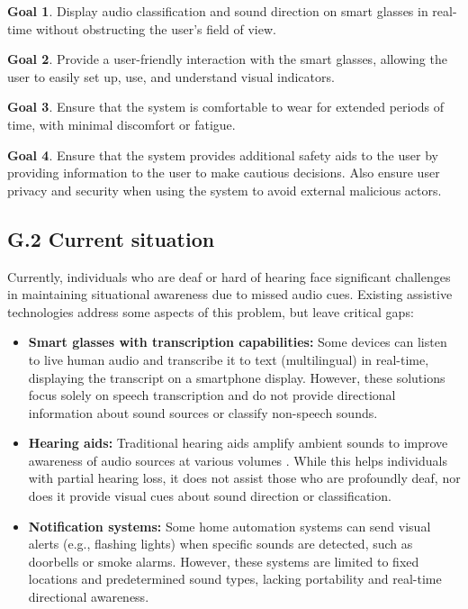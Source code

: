 \documentclass[12pt]{article}
\theoremstyle{definition}
\newtheorem{goal}{Goal}
\begin{document}
\begin{goal}\label{goal:visual_display} Display audio classification and sound
direction on smart glasses in real-time without obstructing the user's field of
view.
\end{goal}

\begin{goal}\label{goal:user_friendly_interaction} Provide a user-friendly
interaction with the smart glasses, allowing the user to easily set up, use, and
understand visual indicators.
\end{goal}

\begin{goal}\label{goal:user_comfort} Ensure that the system is comfortable to
wear for extended periods of time, with minimal discomfort or fatigue.
\end{goal}

\begin{goal}\label{goal:user_safety} Ensure that the system provides additional
safety aids to the user by providing information to the user to make
cautious decisions. Also ensure user privacy and security when using the system
to avoid external malicious actors.
  
\end{goal}
    
\subsection{G.2 Current situation}

Currently, individuals who are deaf or hard of hearing face significant
challenges in maintaining situational awareness due to missed audio cues.
Existing assistive technologies address some aspects of this problem, but leave
critical gaps:

\begin{itemize}
\item \textbf{Smart glasses with transcription capabilities:} Some devices can
listen to live human audio and transcribe it to text (multilingual) in
real-time, displaying the transcript on a smartphone display. However, these
solutions focus solely on speech transcription and do not provide directional
information about sound sources or classify non-speech sounds.

\item \textbf{Hearing aids:} Traditional hearing aids amplify ambient sounds to
improve awareness of audio sources at various volumes \cite{NIDCD2022}. While
this helps individuals with partial hearing loss, it does not assist those who
are profoundly deaf, nor does it provide visual cues about sound direction or
classification.

\item \textbf{Notification systems:} Some home automation systems can send
visual alerts (e.g., flashing lights) when specific sounds are detected, such as
doorbells or smoke alarms. However, these systems are limited to fixed locations
and predetermined sound types, lacking portability and real-time directional
awareness.
\end{itemize}
\end{document}
